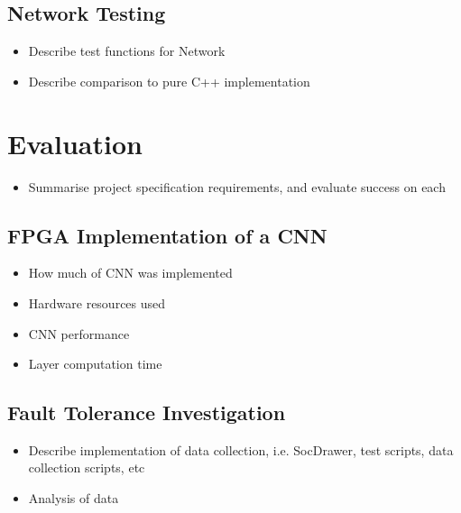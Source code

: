 \documentclass[12pt]{article}
\begin{document}
\subsection{Network Testing}
\label{sec:Test-Network}
\vspace{-12pt}

\begin{itemize}
\item Describe test functions for Network
\item Describe comparison to pure C++ implementation
\end{itemize}

\newpage

\section{Evaluation}
\label{sec:Eval}
\vspace{-12pt}

\begin{itemize}
\item Summarise project specification requirements, and evaluate success on each
\end{itemize}

\subsection{FPGA Implementation of a CNN}
\label{sec:Eval-FPGAImplOfCnn}
\vspace{-12pt}

\begin{itemize}
\item How much of CNN was implemented
\item Hardware resources used
\item CNN performance
\item Layer computation time
\end{itemize}

\subsection{Fault Tolerance Investigation}
\label{sec:Eval-FaultTolInv}
\vspace{-12pt}

\begin{itemize}
\item Describe implementation of data collection, i.e. SocDrawer, test scripts, data collection scripts, etc
\item Analysis of data
\end{itemize}
\end{document}
